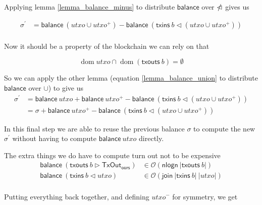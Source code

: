 \documentclass{article}
\newcommand{\order}[1]{\mathcal{O}\left(#1\right)}
\newcommand{\restrictdom}{\lhd}
\newcommand{\subtractdom}{\mathbin{\slashed{\restrictdom}}}
\newcommand{\restrictrange}{\rhd}
\DeclareMathOperator{\dom}{dom}
\begin{document}
Applying lemma \ref{lemma_balance_minus} to distribute $\mathsf{balance}$ over $\subtractdom$ gives us

\begin{equation*}
\begin{split}
    \sigma^\prime & = \mathsf{balance} ~ (utxo \cup utxo^+) - \mathsf{balance} ~ (\mathsf{txins} ~ b \restrictdom (utxo \cup utxo^+)) \\
\end{split}
\end{equation*}

Now it should be a property of the blockchain we can rely on that

\begin{equation*}
\dom utxo \cap \dom (\mathsf{txouts} ~ b) = \emptyset
\end{equation*}

So we can apply the other lemma (equation \ref{lemma_balance_union} to distribute $\mathsf{balance}$ over $\cup$) to give us
\begin{equation*}
\begin{split}
    \sigma^\prime & = \mathsf{balance} ~ utxo + \mathsf{balance} ~ utxo^+ - \mathsf{balance} ~ (\mathsf{txins} ~ b \restrictdom (utxo \cup utxo^+)) \\
             & = \sigma + \mathsf{balance} ~ utxo^+ - \mathsf{balance} ~ (\mathsf{txins} ~ b \restrictdom (utxo \cup utxo^+))
\end{split}
\end{equation*}

In this final step we are able to reuse the previous balance $\sigma$ to
compute the new $\sigma^\prime$ without having to compute
$\mathsf{balance} ~ utxo$ directly.

The extra things we do have to compute turn out not to be expensive
\begin{equation*}
\begin{split}
\mathsf{balance} ~ (\mathsf{txouts} ~ b \restrictrange \mathsf{TxOut_{ours}})  & \in \order{\mathsf{nlogn} ~ |\mathsf{txouts}~ b|} \\
\mathsf{balance} ~ (\mathsf{txins} ~ b \restrictdom utxo) & \in \order{\mathsf{join} ~ |\mathsf{txins}~ b| ~ |utxo|} \\
\end{split}
\end{equation*}

Putting everything back together, and defining $utxo^-$ for symmetry, we get
\end{document}

